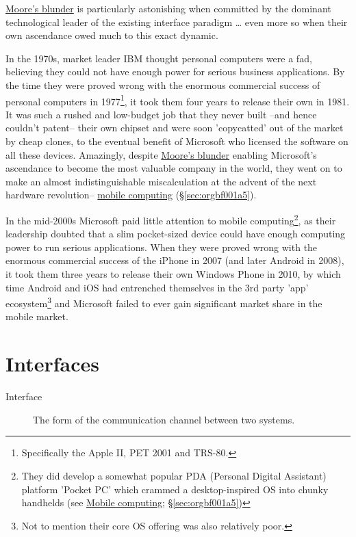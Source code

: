 \documentclass[logo,bsc,singlespacing,parskip]{infthesis}
\begin{document}
\hyperref[orga8601ec]{Moore's blunder} is particularly astonishing when committed by the dominant technological leader of the existing interface paradigm \ldots{} even more so when their own ascendance owed much to this exact dynamic.

In the 1970s, market leader IBM thought personal computers were a fad, believing they could not have enough power for serious business applications.
By the time they were proved wrong with the enormous commercial success of personal computers in 1977\footnote{Specifically the Apple II, PET 2001 and TRS-80.}, it took them four years to release their own in 1981. It was such a rushed and low-budget job that they never built --and hence couldn't patent-- their own chipset and were soon 'copycatted' out of the market by cheap clones, to the eventual benefit of Microsoft who licensed the software on all these devices.
Amazingly, despite \hyperref[orga8601ec]{Moore's blunder} enabling Microsoft's ascendance to become the most valuable company in the world, they went on to make an almost indistinguishable miscalculation at the advent of the next hardware revolution-- \hyperref[sec:orgbf001a5]{mobile computing} (\S \ref{sec:orgbf001a5}).

In the mid-2000s Microsoft paid little attention to mobile computing\footnote{They did develop a somewhat popular PDA (Personal Digital Assistant) platform 'Pocket PC' which crammed a desktop-inspired OS into chunky handhelds (see \hyperref[sec:orgbf001a5]{Mobile computing}; \S \ref{sec:orgbf001a5})}, as their leadership doubted that a slim pocket-sized device could have enough computing power to run serious applications.
When they were proved wrong with the enormous commercial success of the iPhone in 2007 (and later Android in 2008), it took them three years to release their own Windows Phone in 2010, by which time Android and iOS had entrenched themselves in the 3rd party 'app' ecosystem\footnote{Not to mention their core OS offering was also relatively poor.} and Microsoft failed to ever gain significant market share in the mobile market.

\chapter{Interfaces}
\label{sec:org0e55331}
\begin{mdframed}
\begin{description}
\item[{Interface\label{Interface}}] The form of the communication channel between two systems.
\end{description}
\end{mdframed}
\end{document}
